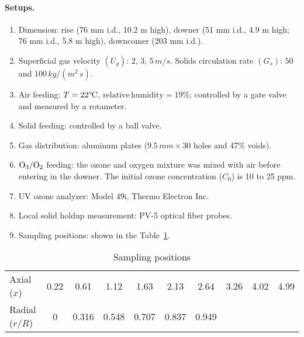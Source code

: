 \paragraph{Setups. }
\begin{enumerate}
    \item Dimension: rise (76 mm i.d., 10.2 m high), 
    downer (51 mm i.d., 4.9 m high; 76 mm i.d., 5.8 m high), 
    downcomer (203 mm i.d.). 

    \item Superficial gas velocity $(U_g)$: $2,\,3,\,5\,\si{m/s}$. 
    Solids circulation rate $(G_s)$: $50$ and $100\,\si{kg/(m^2\,s)}$.
    
    \item Air feeding: $T = 22 ^\circ\hspace{-0.09em}\mathrm{C}$, $\mathrm{relative\, humidity} = 19\%$; 
    controlled by a gate valve and measured by a rotameter.
    
    \item Solid feeding: controlled by a ball valve.
    
    \item Gas distribution: aluminum plates ($9.5\,\si{mm}\times 30$ holes and 47$\%$ voids).
    
    \item $\mathrm{O_3} / \mathrm{O_2}$ feeding: the ozone and oxygen mixture was mixed with air before entering in the downer. 
    The initial ozone concentration ($C_0$) is 10 to 25 ppm.
    
    \item UV ozone analyzer: Model 49i, Thermo Electron Inc.
    
    \item Local solid holdup measurement: PV-5 optical fiber probes.
    
    \item Sampling positions: shown in the Table~\ref{tab: sampling positions}.
\end{enumerate}

\begin{table}[!h]
    \centering
    \caption{Sampling positions}
    \label{tab: sampling positions}
    \begin{tabular}{lccccccccc}
        \toprule
        Axial ($x$) & 0.22 & 0.61 & 1.12 & 1.63 & 2.13 & 2.64 & 3.26 & 4.02 & 4.99 \\
        Radial ($r/R$) & 0 & 0.316 & 0.548 & 0.707 & 0.837 & 0.949 & & &  \\
        \bottomrule
    \end{tabular}
\end{table}

